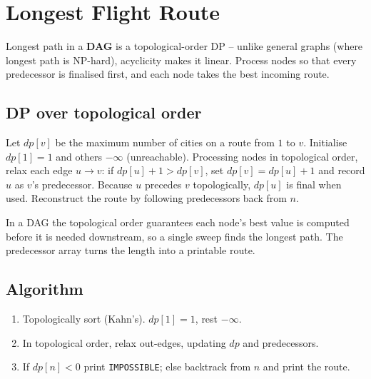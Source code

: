 \section{Longest Flight Route}
\label{sec:cses-longest-flight-route}


\begin{patternbox}
Longest path in a \textbf{DAG} is a topological-order DP -- unlike general
graphs (where longest path is NP-hard), acyclicity makes it linear. Process
nodes so that every predecessor is finalised first, and each node takes the
best incoming route.
\end{patternbox}

\subsection*{DP over topological order}

Let $\textit{dp}[v]$ be the maximum number of cities on a route from $1$ to
$v$. Initialise $\textit{dp}[1]=1$ and others $-\infty$ (unreachable).
Processing nodes in topological order, relax each edge $u\to v$: if
$\textit{dp}[u]+1>\textit{dp}[v]$, set $\textit{dp}[v]=\textit{dp}[u]+1$ and
record $u$ as $v$'s predecessor. Because $u$ precedes $v$ topologically,
$\textit{dp}[u]$ is final when used. Reconstruct the route by following
predecessors back from $n$.

\begin{ideabox}
In a DAG the topological order guarantees each node's best value is computed
before it is needed downstream, so a single sweep finds the longest path.
The predecessor array turns the length into a printable route.
\end{ideabox}

\subsection*{Algorithm}

\begin{enumerate}
  \item Topologically sort (Kahn's). $\textit{dp}[1]=1$, rest $-\infty$.
  \item In topological order, relax out-edges, updating $\textit{dp}$ and
        predecessors.
  \item If $\textit{dp}[n]<0$ print \texttt{IMPOSSIBLE}; else backtrack
        from $n$ and print the route.
\end{enumerate}

